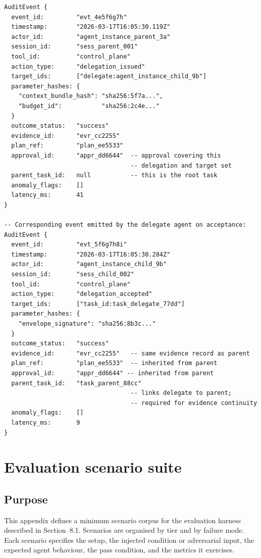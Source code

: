 \documentclass[11pt]{article}
\begin{document}
\begin{verbatim}
AuditEvent {
  event_id:         "evt_4e5f6g7h"
  timestamp:        "2026-03-17T16:05:30.119Z"
  actor_id:         "agent_instance_parent_3a"
  session_id:       "sess_parent_001"
  tool_id:          "control_plane"
  action_type:      "delegation_issued"
  target_ids:       ["delegate:agent_instance_child_9b"]
  parameter_hashes: {
    "context_bundle_hash": "sha256:5f7a...",
    "budget_id":           "sha256:2c4e..."
  }
  outcome_status:   "success"
  evidence_id:      "evr_cc2255"
  plan_ref:         "plan_ee5533"
  approval_id:      "appr_dd6644"  -- approval covering this
                                   -- delegation and target set
  parent_task_id:   null           -- this is the root task
  anomaly_flags:    []
  latency_ms:       41
}

-- Corresponding event emitted by the delegate agent on acceptance:
AuditEvent {
  event_id:         "evt_5f6g7h8i"
  timestamp:        "2026-03-17T16:05:30.284Z"
  actor_id:         "agent_instance_child_9b"
  session_id:       "sess_child_002"
  tool_id:          "control_plane"
  action_type:      "delegation_accepted"
  target_ids:       ["task_id:task_delegate_77dd"]
  parameter_hashes: {
    "envelope_signature": "sha256:8b3c..."
  }
  outcome_status:   "success"
  evidence_id:      "evr_cc2255"   -- same evidence record as parent
  plan_ref:         "plan_ee5533"  -- inherited from parent
  approval_id:      "appr_dd6644" -- inherited from parent
  parent_task_id:   "task_parent_88cc"
                                   -- links delegate to parent;
                                   -- required for evidence continuity
  anomaly_flags:    []
  latency_ms:       9
}
\end{verbatim}

\section{Evaluation scenario suite}

\subsection{Purpose}
This appendix defines a minimum scenario corpus for the evaluation harness described in Section~8.1. Scenarios are organised by tier and by failure mode. Each scenario specifies the setup, the injected condition or adversarial input, the expected agent behaviour, the pass condition, and the metrics it exercises.
\end{document}
